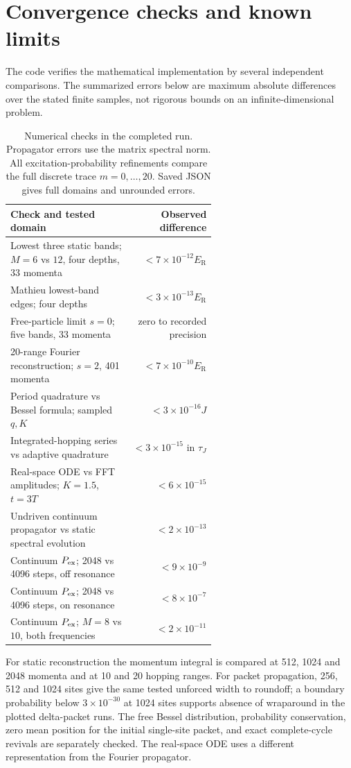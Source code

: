 \documentclass[11pt,oneside]{report}
\numberwithin{equation}{chapter}
\newcommand{\ER}{E_{\mathrm R}}
\begin{document}
\section{Convergence checks and known limits}
The code verifies the mathematical implementation by several independent comparisons. The summarized errors below are maximum absolute differences over the stated finite samples, not rigorous bounds on an infinite-dimensional problem.
\begin{table}[!htbp]\centering\small
\begin{tabular}{P{0.59\linewidth}r}\toprule
Check and tested domain&Observed difference\\\midrule
Lowest three static bands; $M=6$ vs $12$, four depths, 33 momenta&$<7\times10^{-12}\ER$\\
Mathieu lowest-band edges; four depths&$<3\times10^{-13}\ER$\\
Free-particle limit $s=0$; five bands, 33 momenta&zero to recorded precision\\
20-range Fourier reconstruction; $s=2$, 401 momenta&$<7\times10^{-10}\ER$\\
Period quadrature vs Bessel formula; sampled $q,K$&$<3\times10^{-16}J$\\
Integrated-hopping series vs adaptive quadrature&$<3\times10^{-15}$ in $\tau_J$\\
Real-space ODE vs FFT amplitudes; $K=1.5$, $t=3T$&$<6\times10^{-15}$\\
Undriven continuum propagator vs static spectral evolution&$<2\times10^{-13}$\\
Continuum $P_{\rm ex}$; 2048 vs 4096 steps, off resonance&$<9\times10^{-9}$\\
Continuum $P_{\rm ex}$; 2048 vs 4096 steps, on resonance&$<8\times10^{-7}$\\
Continuum $P_{\rm ex}$; $M=8$ vs $10$, both frequencies&$<2\times10^{-11}$\\\bottomrule
\end{tabular}
\caption{Numerical checks in the completed run. Propagator errors use the matrix spectral norm. All excitation-probability refinements compare the full discrete trace $m=0,\ldots,20$. Saved JSON gives full domains and unrounded errors.}\label{tab:checks}\end{table}

For static reconstruction the momentum integral is compared at 512, 1024 and 2048 momenta and at 10 and 20 hopping ranges. For packet propagation, 256, 512 and 1024 sites give the same tested unforced width to roundoff; a boundary probability below $3\times10^{-30}$ at 1024 sites supports absence of wraparound in the plotted delta-packet runs. The free Bessel distribution, probability conservation, zero mean position for the initial single-site packet, and exact complete-cycle revivals are separately checked. The real-space ODE uses a different representation from the Fourier propagator.
\end{document}
